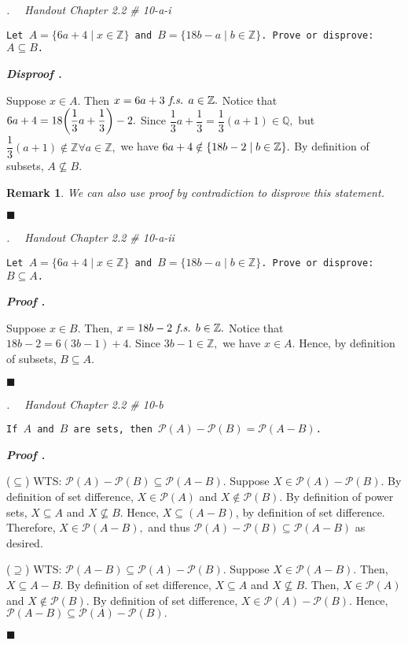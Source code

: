 \documentclass[11pt,letter]{article}
\newcounter{nq}[section]
\newcounter{np}[section]
\newtheorem*{rmk}{\indent Remark}
\newenvironment*{p}{\par\noindent\textbf{\textit{Proof \stepcounter{np}\thenp. }}\par}{\par\hfill $\blacksquare$\par}
\newenvironment*{dis}{\par\noindent\textbf{\textit{Disproof \stepcounter{np}\thenp. }}\par}{\par\hfill $\blacksquare$\par}
\newenvironment*{q}[1]{\noindent\emph{\thesection.\stepcounter{nq}\thenq$\quad $ #1}\par\noindent\texttt}{}
\def\Z{{\mathbb{Z}}}
\def\Q{{\mathbb{Q}}}
\def\pwer{{\mathcal{P}}}
\def\fs{\emph{ f.s. }}
\begin{document}
\begin{framed}\begin{q}
	{Handout Chapter 2.2 \# 10-a-i}
	{Let $A=\{6a+4\mid x\in\Z\}$ and $B=\{18b-a\mid b\in\Z\}$. Prove or disprove: $A\subseteq B$.}
\end{q}\end{framed}
\begin{dis}
	Suppose $x\in A$. Then $x=6a+3\fs a\in\Z.$ Notice that $6a+4=18\qty(\dfrac{1}{3}a+\dfrac{1}{3})-2.$ Since $\dfrac{1}{3}a+\dfrac{1}{3}=\dfrac{1}{3}(a+1)\in\Q,$ but $\dfrac{1}{3}(a+1)\notin\Z\forall a\in\Z,$ we have $6a+4\notin\qty{18b-2\mid b\in\Z}.$ By definition of subsets, $A\nsubseteq B.$
	\begin{rmk}
		We can also use proof by contradiction to disprove this statement.
	\end{rmk}
\end{dis}

\begin{framed}\begin{q}
	{Handout Chapter 2.2 \# 10-a-ii}
	{Let $A=\{6a+4\mid x\in\Z\}$ and $B=\{18b-a\mid b\in\Z\}$. Prove or disprove: $B\subseteq A$.}
\end{q}\end{framed}
\begin{p}
	Suppose $x\in B.$ Then, $x=18b-2\fs b\in\Z.$ Notice that $18b-2=6(3b-1)+4.$ Since $3b-1\in\Z,$ we have $x\in A.$ Hence, by definition of subsets, $B\subseteq A.$	
\end{p}

\begin{framed}\begin{q}
	{Handout Chapter 2.2 \# 10-b}
	{If $A$ and $B$ are sets, then $\pwer(A)-\pwer(B)=\pwer(A-B)$.}
\end{q}\end{framed}
\begin{p}
	($\subseteq$) WTS: $\pwer(A)-\pwer(B)\subseteq\pwer(A-B).$ Suppose $X\in\pwer(A)-\pwer(B).$ By definition of set difference, $X\in\pwer(A)$ and $X\notin\pwer(B).$ By definition of power sets, $X\subseteq A$ and $X\nsubseteq B.$ Hence, $X\subseteq(A-B)$, by definition of set difference. Therefore, $X\in\pwer(A-B),$ and thus $\pwer(A)-\pwer(B)\subseteq\pwer(A-B)$ as desired.\par 
	($\supseteq$) WTS: $\pwer(A-B)\subseteq\pwer(A)-\pwer(B).$ Suppose $X\in\pwer(A-B).$ Then, $X\subseteq A-B.$ By definition of set difference, $X\subseteq A$ and $X\nsubseteq B.$ Then, $X\in\pwer(A)$ and $X\notin\pwer(B).$ By definition of set difference, $X\in\pwer(A)-\pwer(B).$ Hence, $\pwer(A-B)\subseteq\pwer(A)-\pwer(B).$
\end{p}
\end{document}
